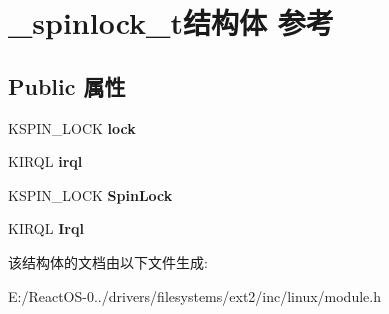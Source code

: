 \hypertarget{struct__spinlock__t}{}\section{\+\_\+spinlock\+\_\+t结构体 参考}
\label{struct__spinlock__t}
\subsection*{Public 属性}
\begin{DoxyCompactItemize}
\item 
\mbox{\label{struct__spinlock__t_ad44c977e7f00619acee3c5c3d0c1b405}} 
K\+S\+P\+I\+N\+\_\+\+L\+O\+CK {\bfseries lock}
\item 
\mbox{\label{struct__spinlock__t_a3b5eb1f4777952e3629171290585fa46}} 
K\+I\+R\+QL {\bfseries irql}
\item 
\mbox{\label{struct__spinlock__t_a4f2230c0b0f422af5d107b25844b0936}} 
K\+S\+P\+I\+N\+\_\+\+L\+O\+CK {\bfseries Spin\+Lock}
\item 
\mbox{\label{struct__spinlock__t_a72749e70a05d5d7482c94fab519bad36}} 
K\+I\+R\+QL {\bfseries Irql}
\end{DoxyCompactItemize}


该结构体的文档由以下文件生成\+:\begin{DoxyCompactItemize}
\item 
E\+:/\+React\+O\+S-\/0../drivers/filesystems/ext2/inc/linux/module.\+h\end{DoxyCompactItemize}
